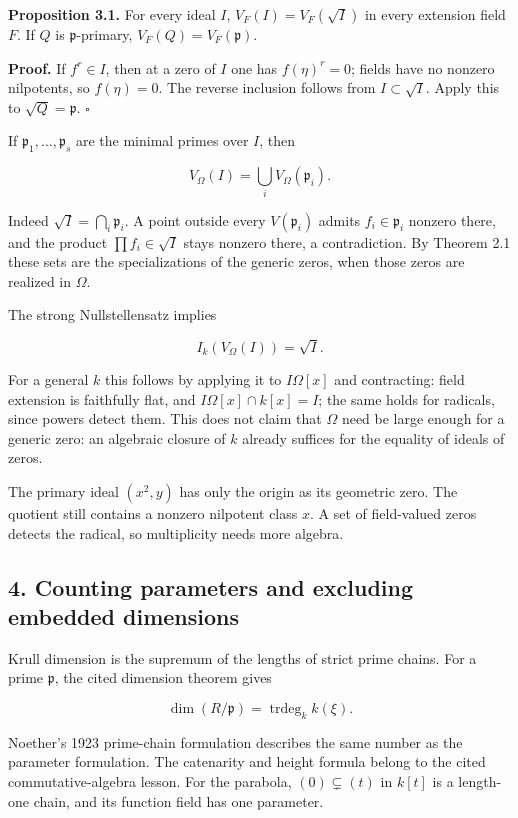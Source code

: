 \documentclass[
]{article}
\begin{document}
\textbf{Proposition 3.1.} For every ideal \(I\), \(V_F(I)=V_F(\sqrt I)\)
in every extension field \(F\). If \(Q\) is \(\mathfrak p\)-primary,
\(V_F(Q)=V_F(\mathfrak p)\).

\textbf{Proof.} If \(f^r\in I\), then at a zero of \(I\) one has
\(f(\eta)^r=0\); fields have no nonzero nilpotents, so \(f(\eta)=0\).
The reverse inclusion follows from \(I\subset\sqrt I\). Apply this to
\(\sqrt Q=\mathfrak p\). \(\square\)

If \(\mathfrak p_1,\ldots,\mathfrak p_s\) are the minimal primes over
\(I\), then

\[
V_\Omega(I)=\bigcup_i V_\Omega(\mathfrak p_i).
\]

Indeed \(\sqrt I=\bigcap_i\mathfrak p_i\). A point outside every
\(V(\mathfrak p_i)\) admits \(f_i\in\mathfrak p_i\) nonzero there, and
the product \(\prod f_i\in\sqrt I\) stays nonzero there, a
contradiction. By Theorem 2.1 these sets are the specializations of the
generic zeros, when those zeros are realized in \(\Omega\).

The strong Nullstellensatz implies

\[
I_k(V_\Omega(I))=\sqrt I.
\]

For a general \(k\) this follows by applying it to \(I\Omega[x]\) and
contracting: field extension is faithfully flat, and
\(I\Omega[x]\cap k[x]=I\); the same holds for radicals, since powers
detect them. This does not claim that \(\Omega\) need be large enough
for a generic zero: an algebraic closure of \(k\) already suffices for
the equality of ideals of zeros.

The primary ideal \((x^2,y)\) has only the origin as its geometric zero.
The quotient still contains a nonzero nilpotent class \(x\). A set of
field-valued zeros detects the radical, so multiplicity needs more
algebra.

\subsection{4. Counting parameters and excluding embedded
dimensions}\label{counting-parameters-and-excluding-embedded-dimensions}

Krull dimension is the supremum of the lengths of strict prime chains.
For a prime \(\mathfrak p\), the cited dimension theorem gives

\[
\dim(R/\mathfrak p)=\operatorname{trdeg}_k k(\xi).
\]

Noether's 1923 prime-chain formulation describes the same number as the
parameter formulation. The catenarity and height formula belong to the
cited commutative-algebra lesson. For the parabola, \((0)\subsetneq(t)\)
in \(k[t]\) is a length-one chain, and its function field has one
parameter.
\end{document}

